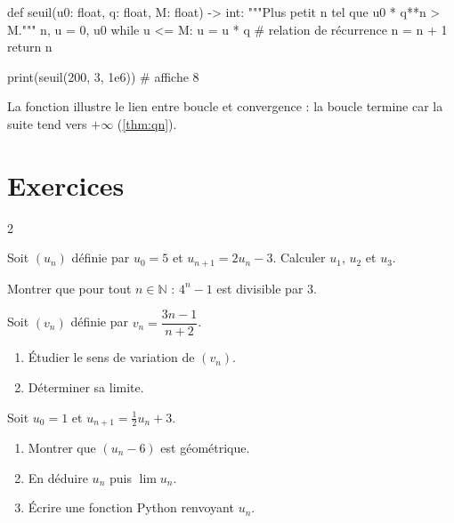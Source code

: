 \begin{python}
def seuil(u0: float, q: float, M: float) -> int:
    """Plus petit n tel que u0 * q**n > M."""
    n, u = 0, u0
    while u <= M:
        u = u * q      # relation de récurrence
        n = n + 1
    return n

print(seuil(200, 3, 1e6))   # affiche 8
\end{python}

La fonction  illustre le lien entre boucle
 et convergence : la boucle termine car la suite tend
vers $+\infty$ (\cref{thm:qn}).

\begin{center}
\end{center}

\section*{Exercices}

\begin{multicols}{2}

Soit $(u_n)$ définie par $u_0 = 5$ et $u_{n+1} = 2u_n - 3$.
Calculer $u_1$, $u_2$ et $u_3$.

Montrer que pour tout $n \in \mathbb{N}$ :
$4^n - 1$ est divisible par $3$.

Soit $(v_n)$ définie par $v_n = \dfrac{3n-1}{n+2}$.
\begin{enumerate}
  \item Étudier le sens de variation de $(v_n)$.
  \item Déterminer sa limite.
\end{enumerate}

Soit $u_0 = 1$ et $u_{n+1} = \frac{1}{2}u_n + 3$.
\begin{enumerate}
  \item Montrer que $(u_n - 6)$ est géométrique.
  \item En déduire $u_n$ puis $\lim u_n$.
  \item Écrire une fonction Python  renvoyant $u_n$.
\end{enumerate}

\end{multicols}

